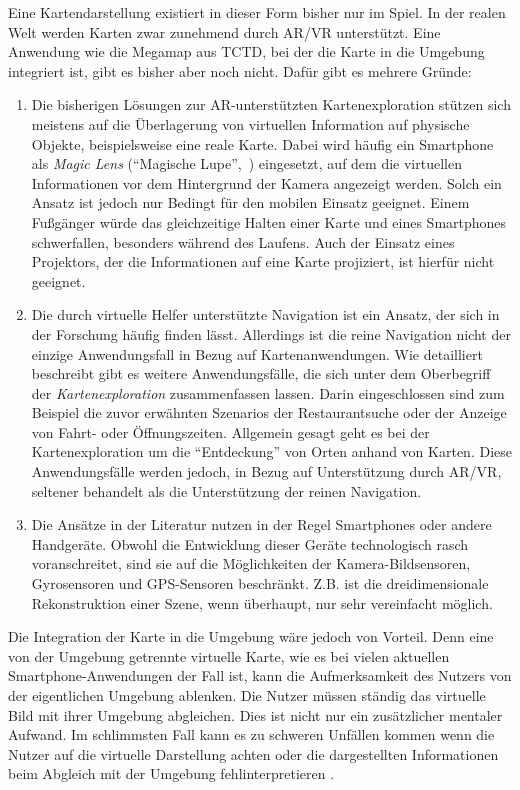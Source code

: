 Eine Kartendarstellung existiert in dieser Form bisher nur im Spiel.
In der realen Welt werden Karten zwar zunehmend durch AR/VR unterstützt.
Eine Anwendung wie die Megamap aus TCTD, bei der die Karte in die Umgebung integriert ist, gibt es bisher aber noch nicht.
Dafür gibt es mehrere Gründe:
\begin{enumerate}
    \item Die bisherigen Lösungen zur AR-unterstützten Kartenexploration stützen sich meistens auf die Überlagerung von virtuellen Information auf physische Objekte, beispielsweise eine reale Karte.
    Dabei wird häufig ein Smartphone als \emph{Magic Lens} (\enquote{Magische Lupe},~\cite{Bier1994}) eingesetzt, auf dem die virtuellen Informationen vor dem Hintergrund der Kamera angezeigt werden.
    Solch ein Ansatz ist jedoch nur Bedingt für den mobilen Einsatz geeignet.
    Einem Fußgänger würde das gleichzeitige Halten einer Karte und eines Smartphones schwerfallen, besonders während des Laufens.
    Auch der Einsatz eines Projektors, der die Informationen auf eine Karte projiziert, ist hierfür nicht geeignet.

    \item Die durch virtuelle Helfer unterstützte Navigation ist ein Ansatz, der sich in der Forschung häufig finden lässt.
    Allerdings ist die reine Navigation nicht der einzige Anwendungsfall in Bezug auf Kartenanwendungen.
    Wie \textcite{Reichenbacher2001} detailliert beschreibt gibt es weitere Anwendungsfälle, die sich unter dem Oberbegriff der \emph{Kartenexploration} zusammenfassen lassen.
    Darin eingeschlossen sind zum Beispiel die zuvor erwähnten Szenarios der Restaurantsuche oder der Anzeige von Fahrt- oder Öffnungszeiten.
    Allgemein gesagt geht es bei der Kartenexploration um die \enquote{Entdeckung} von Orten anhand von Karten.
    Diese Anwendungsfälle werden jedoch, in Bezug auf Unterstützung durch AR/VR, seltener behandelt als die Unterstützung der reinen Navigation.

    \item Die Ansätze in der Literatur nutzen in der Regel Smartphones oder andere Handgeräte.
    Obwohl die Entwicklung dieser Geräte technologisch rasch voranschreitet, sind sie auf die Möglichkeiten der Kamera-Bildsensoren, Gyrosensoren und GPS-Sensoren beschränkt.
    Z.B. ist die dreidimensionale Rekonstruktion einer Szene, wenn überhaupt, nur sehr vereinfacht möglich.
\end{enumerate}

Die Integration der Karte in die Umgebung wäre jedoch von Vorteil.
Denn eine von der Umgebung getrennte virtuelle Karte, wie es bei vielen aktuellen Smartphone-Anwendungen der Fall ist, kann die Aufmerksamkeit des Nutzers von der eigentlichen Umgebung ablenken.
Die Nutzer müssen ständig das virtuelle Bild mit ihrer Umgebung abgleichen.
Dies ist nicht nur ein zusätzlicher mentaler Aufwand.
Im schlimmsten Fall kann es zu schweren Unfällen kommen wenn die Nutzer auf die virtuelle Darstellung achten oder die dargestellten Informationen beim Abgleich mit der Umgebung fehlinterpretieren \parencites{Medenica2011}{Lin2017}.

